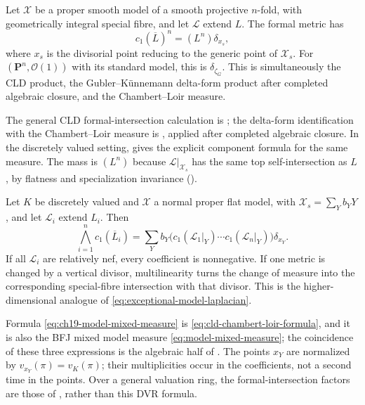\begin{example}
\label{ex:ch19-good-reduction}
Let $\mathcal X$ be a proper smooth model of a smooth projective
$n$-fold, with geometrically integral special fibre, and let $\mathcal L$
extend $L$.  The formal metric has
\[
                       c_1(\overline L)^n=(L^n)\delta_{x_s},
\]
where $x_s$ is the divisorial point reducing to the generic point of
$\mathcal X_s$.  For
$(\mathbf P^n,\mathcal O(1))$ with its standard model, this is
$\delta_{\zeta_G}$.  This is simultaneously the CLD product, the
Gubler--K\"unnemann delta-form product after completed algebraic closure,
and the Chambert--Loir measure.

The general CLD formal-intersection calculation is
; the delta-form identification with the
Chambert--Loir measure is , applied after
completed algebraic closure.  In the discretely valued setting,
 gives the explicit component formula for the
same measure.  The mass
is $(L^n)$ because $\mathcal L|_{\mathcal X_s}$ has the same top
self-intersection as $L$, by flatness and specialization invariance
().
\end{example}

\begin{example}
\label{ex:ch19-several-components}
Let $K$ be discretely valued and $\mathcal X$ a normal proper flat model,
with $\mathcal X_s=\sum_Yb_YY$, and let
$\mathcal L_i$ extend $L_i$.  Then
\begin{equation}
\label{eq:ch19-model-mixed-measure}
 \bigwedge_{i=1}^n c_1(\overline L_i)
    =\sum_Y b_Y
       \bigl(c_1(\mathcal L_1|_Y)\cdots
             c_1(\mathcal L_n|_Y)\bigr)\delta_{x_Y}.
\end{equation}
If all $\mathcal L_i$ are relatively nef, every coefficient is
nonnegative.  If one metric is changed by a vertical divisor, multilinearity
turns the change of measure into the corresponding special-fibre
intersection with that divisor.  This is the higher-dimensional analogue of
\eqref{eq:exceptional-model-laplacian}.

Formula \eqref{eq:ch19-model-mixed-measure} is
\eqref{eq:cld-chambert-loir-formula}, and it is also the BFJ mixed model
measure \eqref{eq:model-mixed-measure}; the coincidence of these three
expressions is the algebraic half of .
The points $x_Y$ are normalized by $v_{x_Y}(\pi)=v_K(\pi)$; their
multiplicities occur in the coefficients, not a second time in the points.
Over a general valuation ring, the formal-intersection factors are those
of , rather than this DVR formula.
\end{example}

